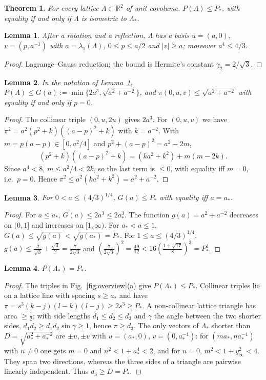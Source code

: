 \documentclass[10pt,twocolumn,a4paper]{article}
\newtheorem{theorem}{Theorem}
\newtheorem{lemma}{Lemma}
\theoremstyle{definition}
\newcommand{\R}{\mathbb{R}}
\begin{document}
\begin{theorem}\label{thm:maxmin}
For every lattice $\Lambda\subset\R^2$ of unit covolume, $P(\Lambda)\le P_*$, with equality if and only if $\Lambda$ is isometric to $\Lambda_*$.
\end{theorem}

\begin{lemma}\label{lem:red}
After a rotation and a reflection, $\Lambda$ has a basis $u=(a,0)$, $v=(p,a^{-1})$ with $a=\lambda_1(\Lambda)$, $0\le p\le a/2$ and $|v|\ge a$; moreover $a^4\le4/3$.
\end{lemma}
\begin{proof}
Lagrange--Gauss reduction; the bound is Hermite's constant $\gamma_2=2/\sqrt3$.
\end{proof}

\begin{lemma}\label{lem:upper}
In the notation of Lemma~\ref{lem:red}, $P(\Lambda)\le G(a):=\min\{2a^3,\sqrt{a^2+a^{-2}}\}$, and $\pi(0,u,v)\le\sqrt{a^2+a^{-2}}$ with equality if and only if $p=0$.
\end{lemma}
\begin{proof}
The collinear triple $(0,u,2u)$ gives $2a^3$. For $(0,u,v)$ we have $\pi^2=a^2(p^2+k)((a-p)^2+k)$ with $k=a^{-2}$. With $m=p(a-p)\in[0,a^2/4]$ and $p^2+(a-p)^2=a^2-2m$,
\[
(p^2+k)((a-p)^2+k)=(ka^2+k^2)+m(m-2k).
\]
Since $a^4<8$, $m\le a^2/4<2k$, so the last term is $\le0$, with equality iff $m=0$, i.e.\ $p=0$. Hence $\pi^2\le a^2(ka^2+k^2)=a^2+a^{-2}$.
\end{proof}

\begin{lemma}\label{lem:G}
For $0<a\le(4/3)^{1/4}$, $G(a)\le P_*$ with equality iff $a=a_*$.
\end{lemma}
\begin{proof}
For $a\le a_*$, $G(a)\le2a^3\le2a_*^3$. The function $g(a)=a^2+a^{-2}$ decreases on $(0,1]$ and increases on $[1,\infty)$. For $a_*<a\le1$, $G(a)\le\sqrt{g(a)}<\sqrt{g(a_*)}=P_*$. For $1\le a\le(4/3)^{1/4}$, $g(a)\le\frac{2}{\sqrt3}+\frac{\sqrt3}{2}=\frac{7}{2\sqrt3}$ and $(\frac{7}{2\sqrt3})^2=\frac{49}{12}<16(\frac{1+\sqrt{17}}{8})^3=P_*^4$.
\end{proof}

\begin{lemma}\label{lem:star}
$P(\Lambda_*)=P_*$.
\end{lemma}
\begin{proof}
The triples in Fig.~\ref{fig:overview}(a) give $P(\Lambda_*)\le P_*$. Collinear triples lie on a lattice line with spacing $s\ge a_*$ and have $\pi=s^3(k-j)(l-k)(l-j)\ge2s^3\ge P_*$. A non-collinear lattice triangle has area $\ge\frac12$; with side lengths $d_1\le d_2\le d_3$ and $\gamma$ the angle between the two shorter sides, $d_1d_2\ge d_1d_2\sin\gamma\ge1$, hence $\pi\ge d_3$. The only vectors of $\Lambda_*$ shorter than $D=\sqrt{a_*^2+a_*^{-2}}$ are $\pm u,\pm v$ with $u=(a_*,0)$, $v=(0,a_*^{-1})$: for $(ma_*,na_*^{-1})$ with $n\neq0$ one gets $m=0$ and $n^2<1+a_*^4<2$, and for $n=0$, $m^2<1+y_\infty^2<4$. They span two directions, whereas the three sides of a triangle are pairwise linearly independent. Thus $d_3\ge D=P_*$.
\end{proof}
\end{document}

